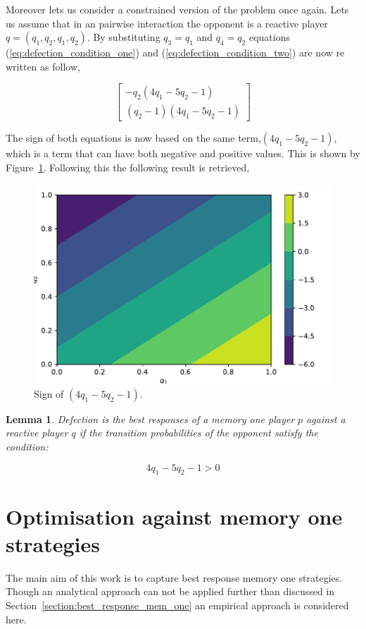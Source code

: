 \documentclass[10pt]{article}
\newtheorem{lemma}[theorem]{Lemma}
\begin{document}
Moreover lets us consider a constrained version of the problem once again. Lets us
assume that in an pairwise interaction the opponent is a reactive player \(q=(q_1, q_2, q_1, q_2)\).
By substituting \(q_3=q_1\) and \(q_4=q_2\) equations (\ref{eq:defection_condition_one})
and (\ref{eq:defection_condition_two}) are now re written as follow,

\[\left[\begin{matrix}- q_{2} \left(4 q_{1} - 5 q_{2} - 1\right)\\
\left(q_{2} - 1\right) \left(4 q_{1} - 5 q_{2} - 1\right)\end{matrix}\right]\]

The sign of both equations is now based on the same term,\(\left(4 q_{1} - 5 q_{2} - 1\right)\),
which is a term that can have both negative and positive values. This is shown
by Figure~\ref{fig:sign_against_reactive}. Following this the following result is retrieved,

\begin{figure}[htbp]
    \centering
    \includegraphics[width=0.45\linewidth]{img/sign_against_reactive.pdf}
      \caption{Sign of \(\left(4 q_{1} - 5 q_{2} - 1\right)\).}
      \label{fig:sign_against_reactive}
  \end{figure}

\begin{lemma}
Defection is the best responses of a memory one player \(p\) against a reactive
player \(q\) if the transition probabilities of the opponent satisfy the
condition:

\begin{equation}
    4 q_{1} - 5 q_{2} - 1 > 0
\end{equation}
\end{lemma}

\section{Optimisation against memory one strategies}\label{section:optimisation_memone}

The main aim of this work is to capture best response memory one strategies.
Though an analytical approach can not be applied further than discussed in
Section~\ref{section:best_response_mem_one} an empirical approach is considered here.
\end{document}
